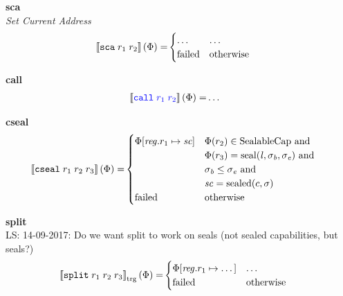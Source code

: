 \documentclass[a4paper]{article}
\newcommand\lau[1]{{\color{purple} \sf \footnotesize {LS: #1}}\\}
\newcommand{\sem}[1]{\left\llbracket #1 \right\rrbracket}
\newcommand{\tsem}[2][\Phi]{\sem{#2}_{\mathrm{trg}}(#1)}
\newcommand{\tand}{\text{ and }}
\newcommand{\totherwise}{\text{otherwise }}
\newcommand{\sourcecolor}[1]{\color{blue}}
\newcommand{\src}[1]{{\sourcecolor{} #1}}
\newcommand{\targetcolor}[1]{\color{black}}
\newcommand{\trg}[1]{{\targetcolor{} #1}}
\newcommand{\zinstr}[1]{\texttt{#1}}
\newcommand{\twoinstr}[3]{
  \ifthenelse{\equal{#2#3}{}}
  {\zinstr{#1}}
  {\zinstr{#1} \; #2 \; #3}
}
\newcommand{\threeinstr}[4]{
  \ifthenelse{\equal{#2#3#4}{}}
  {\zinstr{#1}}
  {\zinstr{#1} \; #2 \; #3 \; #4}
}
\newcommand{\scall}[2]{\twoinstr{\src{call}}{#1}{#2}}
\newcommand{\tsca}[2]{\twoinstr{\trg{sca}}{#1}{#2}}
\newcommand{\tsplit}[3]{\threeinstr{\trg{split}}{#1}{#2}{#3}}
\newcommand{\tcseal}[3]{\threeinstr{\trg{cseal}}{#1}{#2}{#3}}
\newcommand{\update}[2]{[#1 \mapsto #2]}
\newcommand{\updReg}[2]{\update{\reg.#1}{#2}}
\newcommand{\shareddom}[1]{\mathrm{#1}}
\newcommand{\SealableCaps}{\shareddom{SealableCap}}
\newcommand{\lin}{\var{l}}
\newcommand{\seal}[1]{\shareddom{seal}(#1)}
\newcommand{\sealed}[1]{\shareddom{sealed}(#1)}
\newcommand{\failed}{\mathrm{failed}}
\newcommand{\var}[1]{\mathit{#1}}
\newcommand{\reg}{\var{reg}}
\newcommand{\vsc}{\var{sc}}
\newcommand{\baddr}{\var{b}}
\newcommand{\eaddr}{\var{e}}
\begin{document}
\noindent\textbf{sca}\\
\emph{Set Current Address}
\begin{align*}
  \sem{\tsca{r_1}{r_2}}(\Phi) = & 
                                  \begin{cases}
                                    \dots & \dots \\
                                    \failed & \totherwise
                                  \end{cases}
\end{align*}






\noindent\textbf{call}\\
\begin{align*}
  \sem{\scall{\src{r_1}}{\src{r_2}}}(\Phi) = & \dots
\end{align*}

\noindent\textbf{cseal}\\
\begin{align*}
  \sem{\tcseal{r_1}{r_2}{r_3}}(\Phi) = &
                                  \begin{cases}
                                    \Phi\updReg{r_1}{\vsc} &
                                    \arraycolsep=0pt
                                    \begin{array}[t]{l}
                                      \Phi(r_2) \in \SealableCaps \tand \\
                                      \Phi(r_3) = \seal{\lin, \sigma_\baddr, \sigma_\eaddr} \tand \\
                                      \sigma_\baddr \leq \sigma_\eaddr \tand \\ 
                                      \vsc = \sealed{c,\sigma}
                                    \end{array}
                                    \\
                                    \failed & \totherwise
                                  \end{cases}
\end{align*}




\textbf{split}\\
\lau{14-09-2017: Do we want split to work on seals (not sealed capabilities, but seals?)}
\begin{align*}
  \tsem{\tsplit{r_1}{r_2}{r_3}} = &
                               \begin{cases}
                                 \Phi\updReg{r_1}{\dots} &
                                 \arraycolsep=0pt
                                 \begin{array}[t]{l}
                                   \dots
                                 \end{array}\\
                                 \failed & \totherwise
                               \end{cases}
\end{align*}
\end{document}
